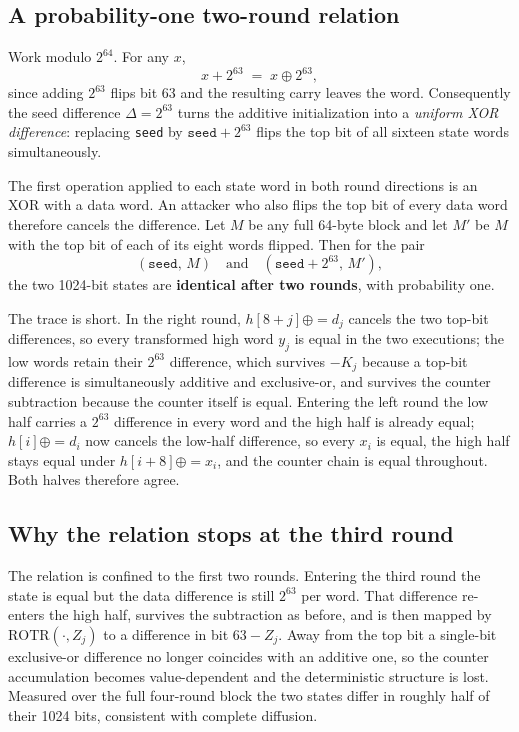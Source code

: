 \documentclass[11pt,a4paper]{article}
\begin{document}
\subsection*{A probability-one two-round relation}

Work modulo \( 2^{64} \). For any \( x \),
\[
  x + 2^{63} \;=\; x \oplus 2^{63},
\]
since adding \( 2^{63} \) flips bit 63 and the resulting carry leaves the word.
Consequently the seed difference \( \Delta = 2^{63} \) turns the additive
initialization into a \emph{uniform XOR difference}: replacing
\texttt{seed} by \( \texttt{seed} + 2^{63} \) flips the top bit of all sixteen
state words simultaneously.

The first operation applied to each state word in both round directions is an
XOR with a data word. An attacker who also flips the top bit of every data word
therefore cancels the difference. Let \( M \) be any full 64-byte block and let
\( M' \) be \( M \) with the top bit of each of its eight words flipped. Then for
the pair
\[
  (\texttt{seed},\, M) \quad\text{and}\quad (\texttt{seed} + 2^{63},\, M'),
\]
the two 1024-bit states are \textbf{identical after two rounds}, with
probability one.

The trace is short. In the right round, \( h[8+j] \mathbin{\oplus}= d_j \)
cancels the two top-bit differences, so every transformed high word \( y_j \) is
equal in the two executions; the low words retain their \( 2^{63} \) difference,
which survives \( -K_j \) because a top-bit difference is simultaneously
additive and exclusive-or, and survives the counter subtraction because the
counter itself is equal. Entering the left round the low half carries a
\( 2^{63} \) difference in every word and the high half is already equal;
\( h[i] \mathbin{\oplus}= d_i \) now cancels the low-half difference, so every
\( x_i \) is equal, the high half stays equal under
\( h[i+8] \mathbin{\oplus}= x_i \), and the counter chain is equal throughout.
Both halves therefore agree.

\subsection*{Why the relation stops at the third round}

The relation is confined to the first two rounds. Entering the third round the
state is equal but the data difference is still \( 2^{63} \) per word. That
difference re-enters the high half, survives the subtraction as before, and is
then mapped by \( \mathrm{ROTR}(\cdot, Z_j) \) to a difference in bit
\( 63 - Z_j \). Away from the top bit a single-bit exclusive-or difference no
longer coincides with an additive one, so the counter accumulation becomes
value-dependent and the deterministic structure is lost. Measured over the full
four-round block the two states differ in roughly half of their 1024 bits,
consistent with complete diffusion.
\end{document}
